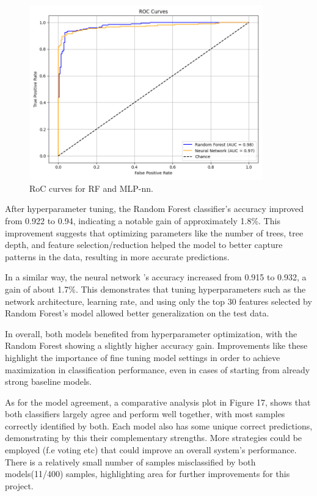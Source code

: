 \documentclass[11pt,a4paper]{article}
\begin{document}
		\begin{figure}[H]
			\centering
			\includegraphics[width=0.9\textwidth]{images/roc_hyper.png}
			\caption{RoC curves for RF and MLP-nn.}
			\label{fig1:}
		\end{figure}		

	
		After hyperparameter tuning, the Random Forest classifier’s accuracy improved from 0.922 to 0.94, 
		indicating a notable gain of approximately 1.8\%. 
		This improvement suggests that optimizing 
		parameters like the number of trees, tree depth, and feature selection/reduction helped the model to
		better capture patterns in the data, resulting in more accurate predictions.

		In a similar way, the neural network 's accuracy increased from 0.915 to 0.932, 
		a gain of about 1.7\%. 
		This demonstrates that tuning hyperparameters such as the network architecture, 
		learning rate, and using only the top 30 features selected by Random Forest's model
		allowed  better generalization on the test data.

		In overall, both models benefited from hyperparameter optimization, 
		with the Random Forest showing a slightly higher accuracy gain. 
		Improvements like these highlight the importance of fine tuning model settings 
		in order to achieve maximization in classification performance, 
		even in cases of starting from already strong baseline models.
		

		As for the model agreement, a comparative analysis plot in Figure 17, 
		shows that both classifiers largely agree and perform well together, 
		with most samples correctly identified by both.
		Each model also has some unique correct predictions, 
		demonstrating by this their complementary strengths.
		More strategies could be employed (f.e voting etc) that could improve an overall
		system's performance.
		There is a relatively small number of samples misclassified by both models(11/400) samples,
		highlighting area for further improvements for this project.
		
\end{document}
